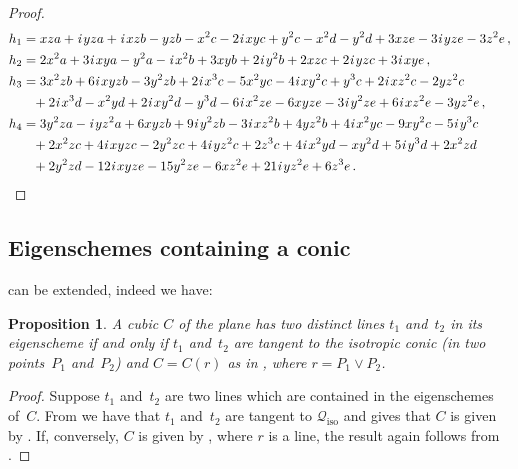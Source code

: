 \documentclass[a4paper, 11pt, reqno]{amsart}
\theoremstyle{plain}
\newtheorem{prop}[lemma]{Proposition}
\theoremstyle{definition}
\newcommand{\iii}{\textit{i}\,}
\newcommand{\iso}{\mathcal{Q}_{\mathrm{iso}}}
\begin{document}
\begin{proof}
\begin{align*}
h_1 & = xza + \iii yza + \iii xzb - yzb - x^2c -2\iii xyc + y^2c - x^2d - y^2d + 3xze -3\iii yze - 3z^2e \,, \\
h_2 & = 2x^2a + 3\iii xya - y^2a -\iii x^2b + 3xyb + 2\iii y^2b + 2xzc + 2\iii yzc +3\iii xye \,, \\
h_3 & = 3x^2zb + 6\iii xyzb - 3y^2zb + 2\iii x^3c - 5x^2yc -4\iii xy^2c + y^3c + 2\iii xz^2c - 2yz^2c \\
&\phantom{=} + 2\iii x^3d - x^2yd + 2\iii xy^2d - y^3d -6\iii x^2ze - 6xyze -3\iii y^2ze + 6\iii xz^2e - 3yz^2e \,, \\
h_4 & = 3y^2za -\iii yz^2a + 6xyzb + 9\iii y^2zb -3\iii xz^2b + 4yz^2b + 4\iii x^2yc - 9xy^2c -5\iii y^3c \\
&\phantom{=} + 2x^2zc + 4\iii xyzc - 2y^2zc + 4\iii yz^2c + 2z^3c + 4\iii x^2yd - xy^2d + 5\iii y^3d + 2x^2zd \\
&\phantom{=} + 2y^2zd -12\iii xyze - 15y^2ze - 6xz^2e + 21\iii yz^2e + 6z^3e \,. \qedhere
\end{align*}
%
\end{proof}

\subsection{Eigenschemes containing a conic}
 can be extended, indeed we have:
%
\begin{prop}
\label{prop:twoLines}
A cubic $C$ of the plane has two distinct lines $t_1$ and~$t_2$ in its eigenscheme if and only if $t_1$ and~$t_2$ are tangent to the isotropic conic (in two points~$P_1$ and~$P_2$) and $C= C(r)$ as in , where $r = P_1 \vee P_2$.
\end{prop}
%
\begin{proof}
Suppose $t_1$ and~$t_2$ are two lines which are contained in the eigenschemes of~$C$. From  we have that $t_1$ and~$t_2$ are tangent to $\iso$ and  gives that $C$ is given by . If, conversely, $C$ is given by , where $r$ is a line, the result again follows from .
\end{proof}
\end{document}
